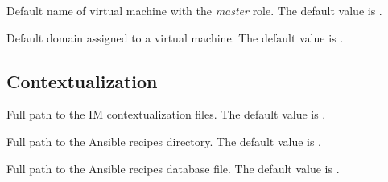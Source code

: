 \documentclass[letterpaper,10pt,english]{sphinxmanual}
\begin{document}
\begin{fulllineitems}
\label{manual:confval-DEFAULT_MASTERVM_NAME}
Default name of virtual machine with the \emph{master} role.
The default value is .

\end{fulllineitems}


\begin{fulllineitems}
\label{manual:confval-DEFAULT_DOMAIN}
Default domain assigned to a virtual machine.
The default value is .

\end{fulllineitems}



\subsection{Contextualization}
\label{manual:contextualization}

\begin{fulllineitems}
\label{manual:confval-CONTEXTUALIZATION_DIR}
Full path to the IM contextualization files.
The default value is .

\end{fulllineitems}


\begin{fulllineitems}
\label{manual:confval-RECIPES_DIR}
Full path to the Ansible recipes directory.
The default value is .

\end{fulllineitems}


\begin{fulllineitems}
\label{manual:confval-RECIPES_DB_FILE}
Full path to the Ansible recipes database file.
The default value is .

\end{fulllineitems}
\end{document}
